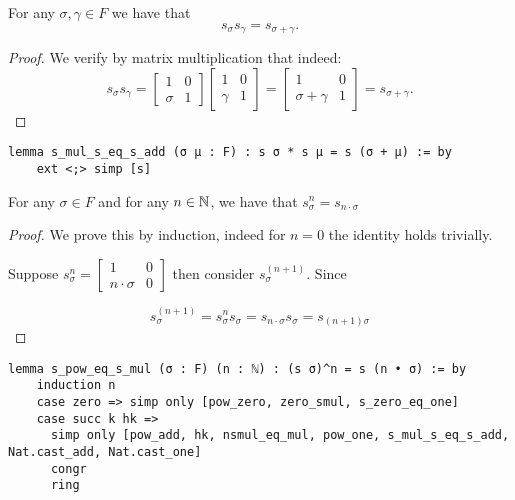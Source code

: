\begin{lemma}
\label{SpecialMatrices.s_mul_s_eq_s_add}
\leanok
    For any $\sigma, \gamma \in F$ we have that
    \[
    s_\sigma s_\gamma = s_{\sigma + \gamma}.
    \]
\end{lemma}
\begin{proof}
\leanok
    We verify by matrix multiplication that indeed:
\begin{equation*}
    s_\sigma s_\gamma = \begin{bmatrix} 1 & 0 \\ \sigma & 1 \end{bmatrix} \begin{bmatrix} 1 & 0 \\ \gamma & 1 \end{bmatrix} = \begin{bmatrix} 1 & 0 \\ \sigma + \gamma & 1 \end{bmatrix} = s_{\sigma + \gamma}.
\end{equation*}
\end{proof}
\begin{footnotesize}
\begin{verbatim}
lemma s_mul_s_eq_s_add (σ μ : F) : s σ * s μ = s (σ + μ) := by
    ext <;> simp [s]
\end{verbatim}
\end{footnotesize}

\begin{lemma}
    \label{SpecialMatrices.s_pow_eq_s_mul}
    \leanok
    For any $\sigma \in F$ and for any $n \in \mathbb{N}$, we have that $s_\sigma^n = s_{n \cdot \sigma}$
\end{lemma}
\begin{proof}
\leanok
    We prove this by induction, indeed for $n= 0$ the identity holds trivially.

    Suppose $s_\sigma^n = \begin{bmatrix}
        1 & 0\\
        n \cdot \sigma & 0\end{bmatrix}$ then consider $s_\sigma^{(n + 1)}$. Since 

        \[
        s_\sigma^{(n + 1)} = s_\sigma^n s_\sigma = s_{n \cdot \sigma} s_\sigma = s_{(n + 1)\sigma}
        \]
\end{proof}
\begin{footnotesize}
\begin{verbatim}
lemma s_pow_eq_s_mul (σ : F) (n : ℕ) : (s σ)^n = s (n • σ) := by
    induction n
    case zero => simp only [pow_zero, zero_smul, s_zero_eq_one]
    case succ k hk =>
      simp only [pow_add, hk, nsmul_eq_mul, pow_one, s_mul_s_eq_s_add, Nat.cast_add, Nat.cast_one]
      congr
      ring
\end{verbatim}
\end{footnotesize}

